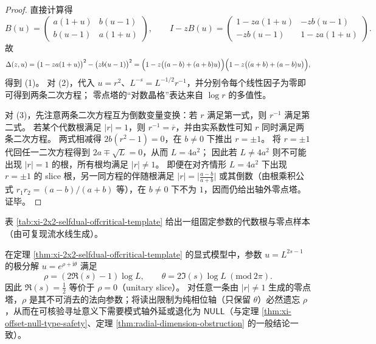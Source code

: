 \begin{proof}
直接计算得
\[
B(u)=\begin{pmatrix}a(1+u)&b(u-1)\\ b(u-1)&a(1+u)\end{pmatrix},
\qquad
I-zB(u)=
\begin{pmatrix}1-za(1+u)&-zb(u-1)\\ -zb(u-1)&1-za(1+u)\end{pmatrix}.
\]
故
\[
\Delta(z,u)
=\bigl(1-za(1+u)\bigr)^2-\bigl(zb(u-1)\bigr)^2
=\Bigl(1-z\bigl((a-b)+(a+b)u\bigr)\Bigr)\Bigl(1-z\bigl((a+b)+(a-b)u\bigr)\Bigr),
\]
得到 (1)。
对 (2)，代入 \(u=r^2\)、\(L^{-s}=L^{-1/2}r^{-1}\)，并分别令每个线性因子为零即可得到两条二次方程；
零点塔的“对数晶格”表达来自 \(\log r\) 的多值性。
\par
对 (3)，先注意两条二次方程互为倒数变量变换：若 \(r\) 满足第一式，则 \(r^{-1}\) 满足第二式。
若某个代数根满足 \(|r|=1\)，则 \(r^{-1}=\overline r\)，并由实系数性可知 \(r\) 同时满足两条二次方程。
两式相减得 \(2b(r^2-1)=0\)，在 \(b\neq 0\) 下推出 \(r=\pm 1\)。
将 \(r=\pm 1\) 代回任一二次方程得到 \(2a\mp\sqrt L=0\)，从而 \(L=4a^2\)；
因此若 \(L\neq 4a^2\) 则不可能出现 \(|r|=1\) 的根，所有根均满足 \(|r|\neq 1\)。
即便在对齐情形 \(L=4a^2\) 下出现 \(r=\pm 1\) 的 slice 根，另一同方程的伴随根满足
\(
|r|=\bigl|\frac{a-b}{a+b}\bigr|
\)
或其倒数（由根乘积公式 \(r_1r_2=(a-b)/(a+b)\) 等），在 \(b\neq 0\) 下不为 \(1\)，因而仍给出轴外零点塔。
证毕。
\end{proof}

表 \ref{tab:xi-2x2-selfdual-offcritical-template} 给出一组固定参数的代数根与零点样本（由可复现流水线生成）。


\begin{corollary}\label{cor:xi-2x2-selfdual-orthogonal-axis-projection-forget}
在定理 \ref{thm:xi-2x2-selfdual-offcritical-template} 的显式模型中，参数
\(
u=L^{2s-1}
\)
的极分解 \(u=e^{\rho+\mathrm{i}\theta}\) 满足
\[
\rho=(2\Re(s)-1)\log L,\qquad \theta=2\Im(s)\log L\ (\mathrm{mod}\ 2\pi).
\]
因此 \(\Re(s)=\tfrac12\) 等价于 \(\rho=0\)（unitary slice）。
对任意一条由 \(|r|\neq 1\) 生成的零点塔，\(\rho\) 是其不可消去的法向参数；将读出限制为纯相位轴（只保留 \(\theta\)）必然遗忘 \(\rho\)，从而在可核验寻址意义下需要模式轴外延或退化为 \(\mathsf{NULL}\)（与定理 \ref{thm:xi-offset-null-type-safety}、定理 \ref{thm:radial-dimension-obstruction} 的一般结论一致）。
\end{corollary}
